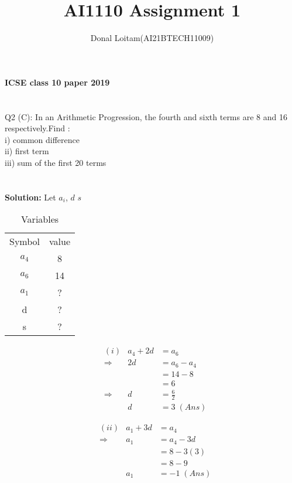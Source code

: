 \documentclass[journal, 12pt, twocolumn]{IEEEtran}
\title{AI1110 Assignment 1}
\author{Donal Loitam(AI21BTECH11009)}
\begin{document}
    \maketitle

    \textbf{\large{ICSE class 10 paper 2019}}\\
    \\
    \\
    {Q2 (C):
    In an Arithmetic Progression, the fourth and sixth terms are 8 and 16 respectively.Find :\\
 i) common difference\\
 ii) first term\\
 iii) sum of the first 20 terms}\\\\\\
    \textbf{\large{Solution:}}
    Let $a_i$, 
 \(d\) 
\(s\)\\

\begin{table}[h!]
\caption{Variables}
    \centering
    \begin{tabular}{|c|c|}
        \hline
        Symbol & value \\
         $ a_4 $  &  8 \\
         $ a_6  $ &  14 \\
         $ a_1 $ &  ?  \\
          d    &  ?  \\
          s    &  ?  \\
          \hline
    \end{tabular}
\end{table}
    
    \begin{align*}
        &(i)&a_4 + 2d &= a_6\\
        &\Rightarrow & 2d &= a_6 - a_4\\
        &            &    &= 14 - 8\\
        &            &    &= 6 \\
        &\Rightarrow & d  &= \tfrac{6}{2} \\
        &            & d  &= 3 \; (Ans)
    \end{align*}
    
   \begin{align*}
        &(ii)&a_1 + 3d &= a_4\\
        &\Rightarrow & a_1 &= a_4 - 3d\\
        &            &     &=  8 - 3(3)\\
        &            &     &=  8 - 9 \\
        &            & a_1 &=  -1 \; (Ans)
    \end{align*}
    
\end{document}
